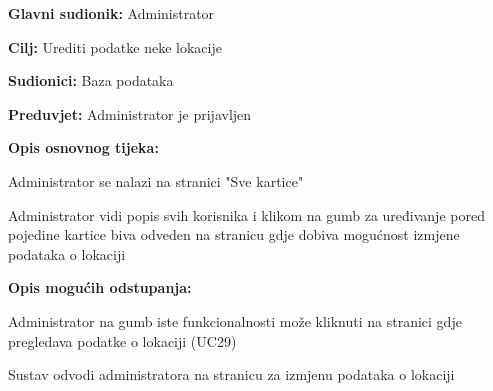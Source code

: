 					\noindent {}
					\begin{packed_item}
	
						\item \textbf{Glavni sudionik: }Administrator
						\item  \textbf{Cilj:} Urediti podatke neke lokacije
						\item  \textbf{Sudionici:} Baza podataka
						\item  \textbf{Preduvjet:} Administrator je prijavljen
						\item  \textbf{Opis osnovnog tijeka:}
						
						\item[] \begin{packed_enum}
	
							\item Administrator se nalazi na stranici "Sve kartice"
							\item Administrator vidi popis svih korisnika i klikom na gumb za uređivanje pored pojedine kartice biva odveden na stranicu gdje dobiva mogućnost izmjene podataka o lokaciji
							
						\end{packed_enum}
						
						\item  \textbf{Opis mogućih odstupanja:}
						\item[] \begin{packed_item}
	
							\item[2.a] Administrator na gumb iste funkcionalnosti može kliknuti na stranici gdje pregledava podatke o lokaciji (UC29)
							\item[] \begin{packed_enum}
								
								\item Sustav odvodi administratora na stranicu za izmjenu podataka o lokaciji
								
							\end{packed_enum}
						\end{packed_item}
					\end{packed_item}
					
